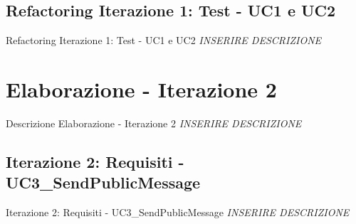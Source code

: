 \documentclass[t]{beamer} %
\begin{document}
\subsection {Refactoring Iterazione 1: Test - UC1 e UC2}
\begin{frame} {Refactoring Iterazione 1: Test - UC1 e UC2}
 \emph{INSERIRE DESCRIZIONE}
\end{frame}

\section{Elaborazione - Iterazione 2}
\begin{frame} {Descrizione Elaborazione - Iterazione 2}
  \emph{INSERIRE DESCRIZIONE}
\end{frame}

\subsection{Iterazione 2: Requisiti - UC3\_SendPublicMessage}
\begin{frame} {Iterazione 2: Requisiti - UC3\_SendPublicMessage}
  \emph{INSERIRE DESCRIZIONE}
\end{frame}
\end{document}
